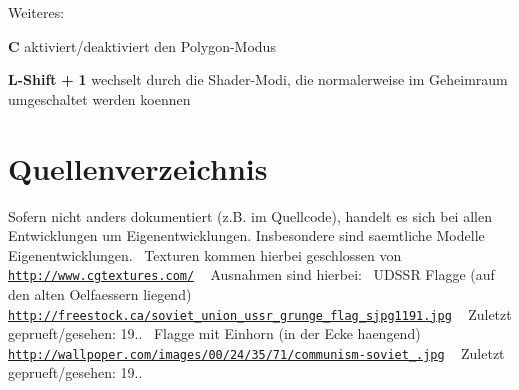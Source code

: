 Weiteres\+:
\begin{DoxyItemize}
\item {\bfseries C} aktiviert/deaktiviert den Polygon-\/\+Modus
\item {\bfseries L-\/\+Shift} {\bfseries +} {\bfseries 1} wechselt durch die Shader-\/\+Modi, die normalerweise im Geheimraum umgeschaltet werden koennen
\end{DoxyItemize}\hypertarget{index_Quellenverzeichnis}{}\section{Quellenverzeichnis}\label{index_Quellenverzeichnis}
Sofern nicht anders dokumentiert (z.\+B. im Quellcode), handelt es sich bei allen Entwicklungen um Eigenentwicklungen. Insbesondere sind saemtliche Modelle Eigenentwicklungen.~\newline
 Texturen kommen hierbei geschlossen von~\newline
 \href{http://www.cgtextures.com/}{\tt http\+://www.\+cgtextures.\+com/} ~\newline
 Ausnahmen sind hierbei\+:~\newline
 U\+D\+S\+S\+R Flagge (auf den alten Oelfaessern liegend)~\newline
 \href{http://freestock.ca/soviet_union_ussr_grunge_flag_sjpg1191.jpg}{\tt http\+://freestock.\+ca/soviet\+\_\+union\+\_\+ussr\+\_\+grunge\+\_\+flag\+\_\+sjpg1191.\+jpg} ~\newline
 Zuletzt geprueft/gesehen\+: 19..~\newline
 Flagge mit Einhorn (in der Ecke haengend)~\newline
 \href{http://wallpoper.com/images/00/24/35/71/communism-soviet_00243571.jpg}{\tt http\+://wallpoper.\+com/images/00/24/35/71/communism-\/soviet\+\_.\+jpg} ~\newline
 Zuletzt geprueft/gesehen\+: 19..~\newline
